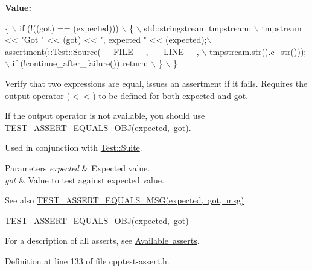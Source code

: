 {\bfseries Value\+:}
\begin{DoxyCode}
\{                                                                   \(\backslash\)
        if (!((got) == (expected)))                                     \(\backslash\)
        \{                                                               \(\backslash\)
            std::stringstream tmpstream;                                \(\backslash\)
            tmpstream << \textcolor{stringliteral}{"Got "} << (got) << \textcolor{stringliteral}{", expected "} << (expected);\(\backslash\)
            assertment(::\mbox{\hyperlink{class_test_1_1_source}{Test::Source}}(\_\_FILE\_\_, \_\_LINE\_\_,               \(\backslash\)
                        tmpstream.str().c\_str()));                      \(\backslash\)
            if (!continue\_after\_failure()) return;                      \(\backslash\)
        \}                                                               \(\backslash\)
    \}
\end{DoxyCode}
Verify that two expressions are equal, issues an assertment if it fails. Requires the output operator ($<$$<$) to be defined for both expected and got.

If the output operator is not available, you should use \mbox{\hyperlink{cpptest-assert_8h_aa506d98e8a5fc575df0361906f7deef8}{T\+E\+S\+T\+\_\+\+A\+S\+S\+E\+R\+T\+\_\+\+E\+Q\+U\+A\+L\+S\+\_\+\+O\+B\+J(expected, got)}}.

Used in conjunction with \mbox{\hyperlink{class_test_1_1_suite}{Test\+::\+Suite}}.


\begin{DoxyParams}{Parameters}
{\em expected} & Expected value. \\
\hline
{\em got} & Value to test against expected value.\\
\hline
\end{DoxyParams}
\begin{DoxySeeAlso}{See also}
\mbox{\hyperlink{cpptest-assert_8h_ab8e9ce729f96abe74b76d98f9568a59c}{T\+E\+S\+T\+\_\+\+A\+S\+S\+E\+R\+T\+\_\+\+E\+Q\+U\+A\+L\+S\+\_\+\+M\+S\+G(expected, got, msg)}} 

\mbox{\hyperlink{cpptest-assert_8h_aa506d98e8a5fc575df0361906f7deef8}{T\+E\+S\+T\+\_\+\+A\+S\+S\+E\+R\+T\+\_\+\+E\+Q\+U\+A\+L\+S\+\_\+\+O\+B\+J(expected, got)}}
\end{DoxySeeAlso}
For a description of all asserts, see \mbox{\hyperlink{asserts}{Available asserts}}. 

Definition at line 133 of file cpptest-\/assert.\+h.

